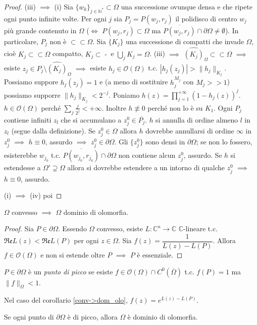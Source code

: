 \begin{proof}
  (iii) $\implies$ (i) Sia $\{w_k\}_{j \in \mathbb{N}^*} \subset \Omega$ una successione ovunque densa e che ripete ogni punto infinite volte. Per ogni $j$ sia $P_j=P(w_j,r_j)$ il polidisco di centro $w_j$ più grande contenuto in $\Omega$ ($\iff$ $P(w_j,r_j) \subset \Omega$ ma $\overline{P(w_j,r_j)}\cap\partial\Omega\not=\emptyset$). In particolare, $P_j$ non è $\subset\subset\Omega$.
  Sia $\{K_j\}$ una successione di compatti che invade $\Omega$, cioè $K_j \subset\subset \Omega$ compatto, $K_j \subset \mathop {K_{j+1}}\limits^ \circ$ e $\displaystyle \bigcup_j K_j=\Omega$.
  (iii) $\implies$ $\widehat{(K_j)}_\Omega \subset\subset \Omega$ $\implies$ esiste $z_j \in P_j\setminus\widehat{(K_j)}_\Omega$ $\implies$ esiste $h_j \in \mathcal{O}(\Omega)$ t.c. $|h_j(z_j)|>\|h_j\|_{K_j}$. Possiamo suppore $h_j(z_j)=1$ e (a meno di sostituire $h_j^{M_j}$ con $M_j>>1$) possiamo supporre $\|h_j\|_{K_j}<2^{-j}$.
  Poniamo $\displaystyle h(z)=\prod_{j=1}^{+\infty} (1-h_j(z))^j$. $h \in \mathcal{O}(\Omega)$ perché $\displaystyle \sum_j \frac{j}{2^j}<+\infty$. Inoltre $h \not\equiv 0$ perché non lo è su $K_1$. Ogni $P_j$ contiene infiniti $z_l$ che si accumulano a $z_j^0 \in \overline{P_j}$.
  $h$ si annulla di ordine almeno $l$ in $z_l$ (segue dalla definizione). Se $z_j^0 \in \Omega$ allora $h$ dovrebbe annullarsi di ordine $\infty$ in $z_j^0$ $\implies$ $h \equiv 0$, assurdo $\implies$ $z_j^0 \in \partial\Omega$.
  Gli $\{z_j^0\}$ sono densi in $\partial\Omega$; se non lo fossero, esisterebbe $w_{j_0}$ t.c. $\overline{P(w_{j_0},r_{j_0})} \cap \partial\Omega$ non contiene alcun $z_j^0$, assurdo. Se $h$ si estendesse a $\Omega' \supsetneq \Omega$ allora si dovrebbe estendere a un intorno di qualche $z_j^0$ $\implies$ $h \equiv 0$, assurdo.

  (i) $\implies$ (iv) poi
\end{proof}

\begin{cor} \label{conv->dom_olo}
  $\Omega$ convesso $\implies$ $\Omega$ dominio di olomorfia.
\end{cor}

\begin{proof}
  Sia $P \in \partial \Omega$. Essendo $\Omega$ convesso, esiste $L: \mathbb{C}^n \longrightarrow \mathbb{C}$ $\mathbb{C}$-lineare t.c. $\mathfrak{Re}L(z) < \mathfrak{Re}L(P)$ per ogni $z \in \Omega$. Sia $f(z)=\dfrac{1}{L(z)-L(P)}$. Allora $f \in \mathcal{O}(\Omega)$ e non si estende oltre $P$ $\implies$ $P$ è essenziale.
\end{proof}

\begin{defn}
  $P \in \partial\Omega$ è un \textit{punto di picco} se esiste $f \in \mathcal{O}(\Omega) \cap C^0(\overline{\Omega})$ t.c. $f(P)=1$ ma $\|f\|_\Omega<1$.
\end{defn}

\begin{ex}
  Nel caso del corollario \ref{conv->dom_olo}, $f(z)=e^{L(z)-L(P)}$.
\end{ex}

\begin{exc}
  Se ogni punto di $\partial\Omega$ è di picco, allora $\Omega$ è dominio di olomorfia.
\end{exc}
